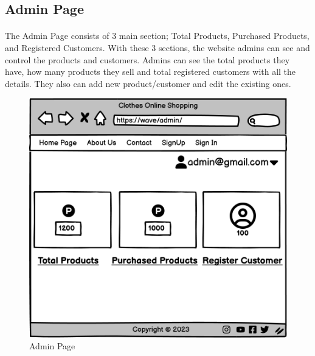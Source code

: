 \subsection{Admin Page}
\bigskip
\paragraph{}
The Admin Page consists of 3 main section; Total Products, Purchased Products, and Registered Customers. With these 3 sections, the website admins can see and control the products and customers. Admins can see the total products they have, how many products they sell and total registered customers with all the details. They also can add new product/customer and edit the existing ones. 

\bigskip
\bigskip
\bigskip
\begin{figure}[h]
\centerline{\includegraphics[scale=1.]{images/Admin.png}}
\caption{Admin Page}
\label{fig}
\end{figure}